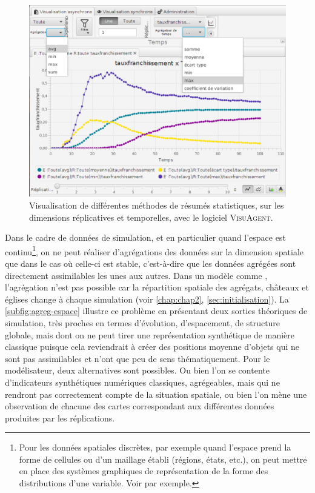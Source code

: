 \begin{figure}[H]
	\centering
	\includegraphics[width=\linewidth]{img/visuagent_agregations.png}
	\caption{Visualisation de différentes méthodes de résumés statistiques, sur les dimensions réplicatives et temporelles, avec le logiciel \textsc{VisuAgent}.}
	\label{subfig:visuagent}
\end{figure}


Dans le cadre de données de simulation, et en particulier quand l'espace est continu\footnote{
	Pour les données spatiales discrètes, par exemple quand l'espace prend la forme de cellules ou d'un maillage établi (régions, états, etc.), on peut mettre en place des systèmes graphiques de représentation de la forme des distributions d'une variable.
	Voir \textcite{ribecca_chart_2018} par exemple.	
}, on ne peut réaliser d'agrégations des données sur la dimension spatiale que dans le cas où celle-ci est stable, c'est-à-dire que les données agrégées sont directement assimilables les unes aux autres.
Dans un modèle comme \simfeodal{}, l'agrégation n'est pas possible car la répartition spatiale des agrégats, châteaux et églises change à chaque simulation (voir \cref{chap:chap2}, \cref{sec:initialisation}).
La \cref{subfig:agreg-espace} illustre ce problème en présentant deux sorties théoriques de simulation, très proches en termes d'évolution, d'espacement, de structure globale, mais dont on ne peut tirer une représentation synthétique de manière classique puisque cela reviendrait à \og créer\fg{} des positions moyenne d'objets qui ne sont pas assimilables et n'ont que peu de sens thématiquement.
Pour le modélisateur, deux alternatives sont possibles.
Ou bien l'on se contente d'indicateurs synthétiques numériques classiques, agrégeables, mais qui ne rendront pas correctement compte de la situation spatiale, ou bien l'on mène une observation de chacune des cartes correspondant aux différentes données produites par les réplications.

